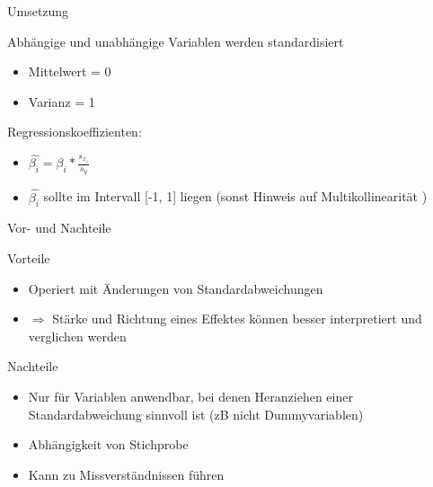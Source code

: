\documentclass[10pt]{beamer}
\begin{document}
\begin{frame}{Umsetzung}
	
	\begin{Large}{Abhängige und unabhängige Variablen werden standardisiert}\end{Large}
	
	\begin{itemize}
		\item Mittelwert = 0
		\item Varianz = 1
	\end{itemize}
	
	\begin{Large}{Regressionskoeffizienten:}\end{Large}
		\begin{itemize}
     	       \item $\hat{\beta_i} = \beta_i*\frac{s_{x_i}}{s_y}$
     	       \item $\hat{\beta_i}$ sollte im Intervall [-1, 1] liegen (sonst Hinweis auf Multikollinearität )
		\end{itemize}
	
\end{frame}

\begin{frame}{Vor- und Nachteile}
	
	\begin{Large}{Vorteile}\end{Large}
	
	\begin{itemize}
		\item Operiert mit Änderungen von Standardabweichungen
		\item $\Rightarrow$ Stärke und Richtung eines Effektes können besser interpretiert und verglichen werden
	\end{itemize}
	
	\begin{Large}{Nachteile}\end{Large}
	
	  \begin{itemize}
		\item Nur für Variablen anwendbar, bei denen Heranziehen einer Standardabweichung sinnvoll ist (zB nicht Dummyvariablen)
		\item Abhängigkeit von Stichprobe
		\item Kann zu Missverständnissen führen
	  \end{itemize}
	
\end{frame}
\end{document}
